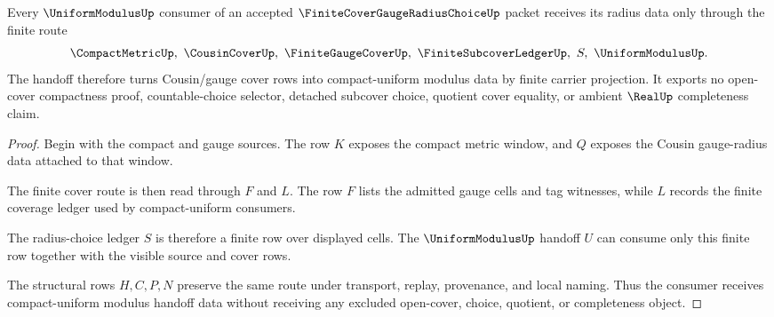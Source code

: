 \begin{theorem}
\label{thm:finite-cover-gauge-radius-choice-uniform-modulus-handoff}
Every $\UniformModulusUp$ consumer of an accepted $\FiniteCoverGaugeRadiusChoiceUp$ packet receives its radius data only through the finite route
$$
\CompactMetricUp,\ \CousinCoverUp,\ \FiniteGaugeCoverUp,\ \FiniteSubcoverLedgerUp,\ S,\ \UniformModulusUp .
$$
The handoff therefore turns Cousin/gauge cover rows into compact-uniform modulus data by finite carrier projection. It exports no open-cover compactness proof, countable-choice selector, detached subcover choice, quotient cover equality, or ambient $\RealUp$ completeness claim.
\end{theorem}
\begin{proof}
Begin with the compact and gauge sources. The row $K$ exposes the compact metric window, and $Q$ exposes the Cousin gauge-radius data attached to that window.

The finite cover route is then read through $F$ and $L$. The row $F$ lists the admitted gauge cells and tag witnesses, while $L$ records the finite coverage ledger used by compact-uniform consumers.

The radius-choice ledger $S$ is therefore a finite row over displayed cells. The $\UniformModulusUp$ handoff $U$ can consume only this finite row together with the visible source and cover rows.

The structural rows $H,C,P,N$ preserve the same route under transport, replay, provenance, and local naming. Thus the consumer receives compact-uniform modulus handoff data without receiving any excluded open-cover, choice, quotient, or completeness object.
\end{proof}


